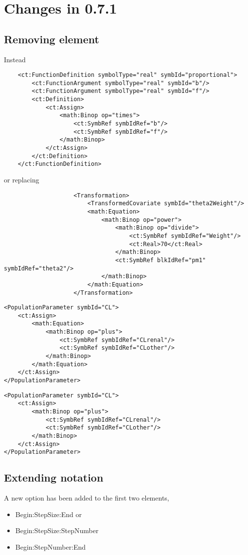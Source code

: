 
\chapter{Changes in 0.7.1}


\section{Removing  element}
Instead
\lstset{language=XML}
\begin{lstlisting}
    <ct:FunctionDefinition symbolType="real" symbId="proportional">
        <ct:FunctionArgument symbolType="real" symbId="b"/>
        <ct:FunctionArgument symbolType="real" symbId="f"/>
        <ct:Definition>
            <ct:Assign>
                <math:Binop op="times">
                    <ct:SymbRef symbIdRef="b"/>
                    <ct:SymbRef symbIdRef="f"/>
                </math:Binop>
            </ct:Assign>
        </ct:Definition>
    </ct:FunctionDefinition>
\end{lstlisting}

or replacing
\lstset{language=XML}
\begin{lstlisting}
                    <Transformation>
                        <TransformedCovariate symbId="theta2Weight"/>
                        <math:Equation>
                            <math:Binop op="power">
                                <math:Binop op="divide">
                                    <ct:SymbRef symbIdRef="Weight"/>
                                    <ct:Real>70</ct:Real>
                                </math:Binop>
                                <ct:SymbRef blkIdRef="pm1" symbIdRef="theta2"/>
                            </math:Binop>
                        </math:Equation>
                    </Transformation>
\end{lstlisting}

\lstset{language=XML}
\begin{lstlisting}
<PopulationParameter symbId="CL">
    <ct:Assign>
        <math:Equation>
            <math:Binop op="plus">
                <ct:SymbRef symbIdRef="CLrenal"/>
                <ct:SymbRef symbIdRef="CLother"/>
            </math:Binop>
        </math:Equation>
    </ct:Assign>
</PopulationParameter>
\end{lstlisting}

\lstset{language=XML}
\begin{lstlisting}
<PopulationParameter symbId="CL">
    <ct:Assign>
        <math:Binop op="plus">
            <ct:SymbRef symbIdRef="CLrenal"/>
            <ct:SymbRef symbIdRef="CLother"/>
        </math:Binop>
    </ct:Assign>
</PopulationParameter>
\end{lstlisting}


\section{Extending  notation}
A new option has been added to the first two elements, 
\begin{itemize}
\item 
Begin:StepSize:End or
\item 
Begin:StepSize:StepNumber
\item 
Begin:StepNumber:End
\end{itemize}


